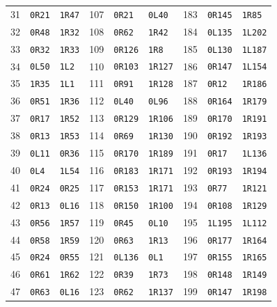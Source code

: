 \begin{longtable}{rll@{\hspace{8mm}}rll@{\hspace{8mm}}rll}
31 & \texttt{0R21} & \texttt{1R47} & 107 & \texttt{0R21} & \texttt{0L40} & 183 & \texttt{0R145} & \texttt{1R85} \\
32 & \texttt{0R48} & \texttt{1R32} & 108 & \texttt{0R62} & \texttt{1R42} & 184 & \texttt{0L135} & \texttt{1L202} \\
33 & \texttt{0R32} & \texttt{1R33} & 109 & \texttt{0R126} & \texttt{1R8} & 185 & \texttt{0L130} & \texttt{1L187} \\
34 & \texttt{0L50} & \texttt{1L2} & 110 & \texttt{0R103} & \texttt{1R127} & 186 & \texttt{0R147} & \texttt{1L154} \\
35 & \texttt{1R35} & \texttt{1L1} & 111 & \texttt{0R91} & \texttt{1R128} & 187 & \texttt{0R12} & \texttt{1R186} \\
36 & \texttt{0R51} & \texttt{1R36} & 112 & \texttt{0L40} & \texttt{0L96} & 188 & \texttt{0R164} & \texttt{1R179} \\
37 & \texttt{0R17} & \texttt{1R52} & 113 & \texttt{0R129} & \texttt{1R106} & 189 & \texttt{0R170} & \texttt{1R191} \\
38 & \texttt{0R13} & \texttt{1R53} & 114 & \texttt{0R69} & \texttt{1R130} & 190 & \texttt{0R192} & \texttt{1R193} \\
39 & \texttt{0L11} & \texttt{0R36} & 115 & \texttt{0R170} & \texttt{1R189} & 191 & \texttt{0R17} & \texttt{1L136} \\
40 & \texttt{0L4} & \texttt{1L54} & 116 & \texttt{0R183} & \texttt{1R171} & 192 & \texttt{0R193} & \texttt{1R194} \\
41 & \texttt{0R24} & \texttt{0R25} & 117 & \texttt{0R153} & \texttt{1R171} & 193 & \texttt{0R77} & \texttt{1R121} \\
42 & \texttt{0R13} & \texttt{0L16} & 118 & \texttt{0R150} & \texttt{1R100} & 194 & \texttt{0R108} & \texttt{1R129} \\
43 & \texttt{0R56} & \texttt{1R57} & 119 & \texttt{0R45} & \texttt{0L10} & 195 & \texttt{1L195} & \texttt{1L112} \\
44 & \texttt{0R58} & \texttt{1R59} & 120 & \texttt{0R63} & \texttt{1R13} & 196 & \texttt{0R177} & \texttt{1R164} \\
45 & \texttt{0R24} & \texttt{0R55} & 121 & \texttt{0L136} & \texttt{0L1} & 197 & \texttt{0R155} & \texttt{1R165} \\
46 & \texttt{0R61} & \texttt{1R62} & 122 & \texttt{0R39} & \texttt{1R73} & 198 & \texttt{0R148} & \texttt{1R149} \\
47 & \texttt{0R63} & \texttt{0L16} & 123 & \texttt{0R62} & \texttt{1R137} & 199 & \texttt{0R147} & \texttt{1R198} \\

\end{longtable}
